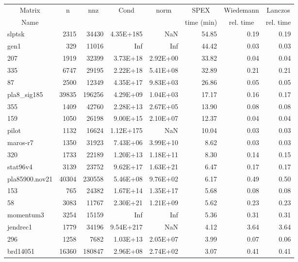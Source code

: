\documentclass[10pt]{article}
\begin{document}
\newpage
\begin{longtable}{|l|r|r|r|r|r|r|r|}
\hline	
\multicolumn{1}{|c|}{Matrix} &
\multicolumn{1}{c|}{n} &
\multicolumn{1}{c|}{nnz} &
\multicolumn{1}{c|}{Cond} &
\multicolumn{1}{c|}{norm} &
\multicolumn{1}{c|}{SPEX} &
\multicolumn{1}{c|}{Wiedemann} &
\multicolumn{1}{c|}{Lanczos}  \\
\multicolumn{1}{|c|}{Name} &
\multicolumn{1}{c|}{ } &
\multicolumn{1}{c|}{ } &
\multicolumn{1}{c|}{ } &
\multicolumn{1}{c|}{ } &
\multicolumn{1}{c|}{time (min)} &
\multicolumn{1}{c|}{rel. time} &
\multicolumn{1}{c|}{rel. time } \\
\hline
\endhead
slptsk	&	2315	&	34430	&	4.35E+185	&	NaN	&	54.85	&	0.19	&	0.19	\\
gen1	&	329	&	11016	&	Inf	&	Inf	&	44.42	&	0.03	&	0.03	\\
207	&	1919	&	32399	&	3.73E+18	&	2.92E+00	&	33.82	&	0.04	&	0.04	\\
335	&	6747	&	29195	&	2.22E+18	&	5.41E+08	&	32.89	&	0.21	&	0.21	\\
87	&	2500	&	12349	&	4.35E+17	&	9.83E+03	&	26.86	&	0.05	&	0.05	\\
pla8\_sig185	&	39835	&	196256	&	4.29E+09	&	1.04E+03	&	17.17	&	0.16	&	0.17	\\
355	&	1409	&	42760	&	2.28E+13	&	2.67E+05	&	13.90	&	0.08	&	0.08	\\
159	&	1050	&	26198	&	9.00E+15	&	2.10E+07	&	12.37	&	0.04	&	0.04	\\
pilot	&	1132	&	16624	&	1.12E+175	&	NaN	&	10.04	&	0.03	&	0.03	\\
maros-r7	&	1350	&	31923	&	7.43E+06	&	3.99E+10	&	8.62	&	0.03	&	0.03	\\
320	&	1733	&	22189	&	1.20E+13	&	1.18E+11	&	8.30	&	0.14	&	0.15	\\
stat96v4	&	3139	&	23752	&	9.62E+17	&	1.63E+21	&	6.47	&	0.17	&	0.17	\\
pla85900.nov21	&	40304	&	230558	&	5.46E+08	&	9.76E+02	&	6.17	&	0.49	&	0.50	\\
153	&	765	&	24382	&	1.67E+14	&	1.35E+17	&	5.68	&	0.08	&	0.08	\\
58	&	3083	&	11767	&	2.30E+21	&	1.21E+09	&	5.62	&	0.23	&	0.23	\\
momentum3	&	3254	&	15159	&	Inf	&	Inf	&	5.36	&	0.31	&	0.31	\\
jendrec1	&	1779	&	34196	&	9.54E+217	&	NaN	&	4.12	&	3.64	&	3.64	\\
296	&	1258	&	7682	&	1.03E+13	&	2.05E+07	&	3.99	&	0.07	&	0.06	\\
brd14051	&	16360	&	180847	&	2.96E+08	&	2.74E+02	&	3.07	&	0.41	&	0.41	\\

\end{longtable}
\end{document}
